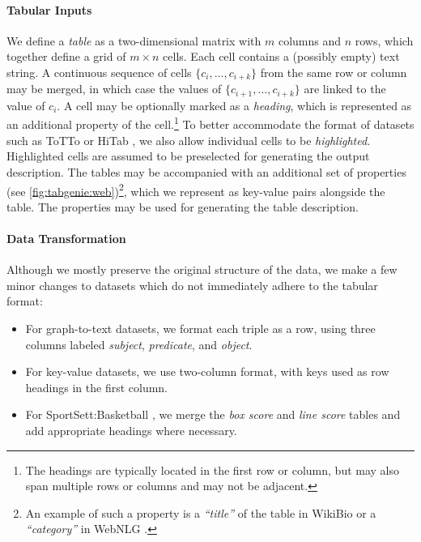 \paragraph{Tabular Inputs} We define a \textit{table} as a two-dimensional matrix with $m$ columns and $n$ rows, which together define a grid of $m \times n$ cells. Each cell contains a (possibly empty) text string. A continuous sequence of cells $\{c_{i}, \ldots, c_{i+k}\}$ from the same row or column may be merged, in which case the values of $\{c_{i+1},\ldots,c_{i+k}\}$ are linked to the value of $c_{i}$.  A cell may be optionally marked as a \textit{heading}, which is represented as an additional property of the cell.\footnote{The headings are typically located in the first row or column, but may also span multiple rows or columns and may not be adjacent.} To better accommodate the format of datasets such as ToTTo \cite{parikhToTToControlledTableToText2020} or HiTab \cite{chengHiTabHierarchicalTable2021}, we also allow individual cells to be \textit{highlighted}. Highlighted cells are assumed to be preselected for generating the output description. The tables may be accompanied with an additional set of properties (see \autoref{fig:tabgenie:web})\footnote{An example of such a property is a \textit{``title''} of the table in WikiBio \cite{lebretNeuralTextGeneration2016} or a \textit{``category''} in WebNLG \cite{gardentWebNLGChallengeGenerating2017}.}, which we represent as key-value pairs alongside the table. The properties may be used for generating the table description.

\paragraph{Data Transformation} Although we mostly preserve the original structure of the data, we make a few minor changes to datasets which do not immediately adhere to the tabular format:

\begin{itemize}
    \item For graph-to-text datasets, we format each triple as a row, using three columns labeled \textit{subject}, \textit{predicate}, and \textit{object}.
    \item For key-value datasets, we use two-column format, with keys used as row headings in the first column.
    \item For SportSett:Basketball \cite{thomson2020sportsett}, we merge the \textit{box score} and \textit{line score} tables and add appropriate headings where necessary.
\end{itemize}

